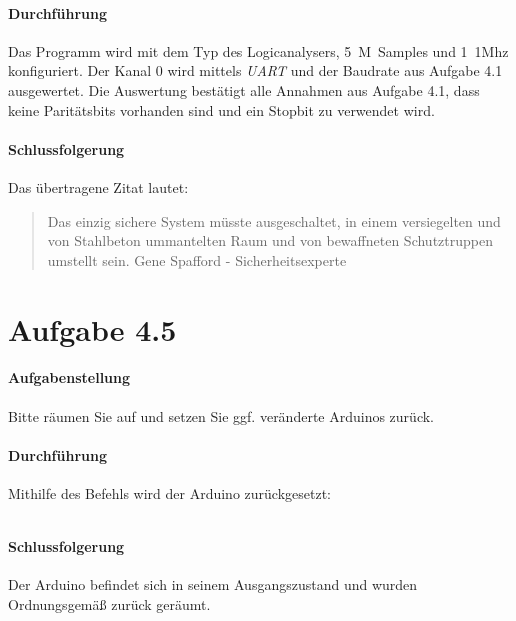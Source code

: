 \paragraph{Durchführung}
Das Programm wird mit dem Typ des Logicanalysers, \SI{5}{M Samples} und \SI{1}{1Mhz} konfiguriert. Der Kanal 0 wird mittels \textit{UART} und der Baudrate aus Aufgabe 4.1 ausgewertet. Die Auswertung bestätigt alle Annahmen aus Aufgabe 4.1, dass keine Paritätsbits vorhanden sind und ein Stopbit zu verwendet wird.

\paragraph{Schlussfolgerung}
Das übertragene Zitat lautet:
\begin{quote}
	Das einzig sichere System müsste ausgeschaltet, in einem versiegelten und von Stahlbeton ummantelten Raum und von bewaffneten Schutztruppen umstellt sein. Gene Spafford - Sicherheitsexperte
\end{quote}





\newpage
\section{Aufgabe 4.5}
\paragraph{Aufgabenstellung}
Bitte räumen Sie auf und setzen Sie ggf. veränderte Arduinos zurück.

\paragraph{Durchführung}
Mithilfe des Befehls wird der Arduino zurückgesetzt:

\inputminted[breaklines, fontsize=\fontsize{10pt}{10pt}]{bash}{../docs/reset-dmx.txt}

\paragraph{Schlussfolgerung}
Der Arduino befindet sich in seinem Ausgangszustand und wurden Ordnungsgemäß zurück geräumt.